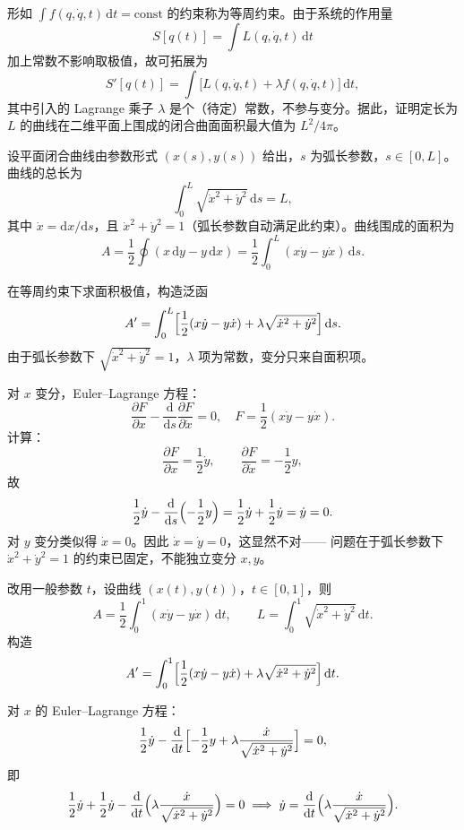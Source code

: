 \begin{question}
形如 \(\displaystyle\int f(q,\dot q,t)\,\mathrm dt = \text{const}\) 的约束称为等周约束。由于系统的作用量
\[
S[q(t)] = \int L(q,\dot q,t)\,\mathrm dt
\]
加上常数不影响取极值，故可拓展为
\[
S'[q(t)] = \int \bigl[L(q,\dot q,t) + \lambda f(q,\dot q,t)\bigr]\,\mathrm dt,
\]
其中引入的 Lagrange 乘子 \(\lambda\) 是个（待定）常数，不参与变分。据此，证明定长为 \(L\) 的曲线在二维平面上围成的闭合曲面面积最大值为 \(L^2/4\pi\)。
\begin{solution}
设平面闭合曲线由参数形式 \((x(s), y(s))\) 给出，\(s\) 为弧长参数，\(s \in [0,L]\)。曲线的总长为
\[
\int_0^L \sqrt{\dot x^2 + \dot y^2}\,\mathrm ds = L,
\]
其中 \(\dot x = \mathrm dx/\mathrm ds\)，且 \(\dot x^2 + \dot y^2 = 1\)（弧长参数自动满足此约束）。曲线围成的面积为
\[
A = \frac12\oint (x\,\mathrm dy - y\,\mathrm dx)
= \frac12\int_0^L (x\dot y - y\dot x)\,\mathrm ds .
\]

在等周约束下求面积极值，构造泛函
\[
A' = \int_0^L \Bigl[\frac12(x\dot y - y\dot x) + \lambda\sqrt{\dot x^2 + \dot y^2}\Bigr]\,\mathrm ds .
\]
由于弧长参数下 \(\sqrt{\dot x^2 + \dot y^2}=1\)，\(\lambda\) 项为常数，变分只来自面积项。

对 \(x\) 变分，Euler--Lagrange 方程：
\[
\frac{\partial F}{\partial x} - \frac{\mathrm d}{\mathrm ds}\frac{\partial F}{\partial\dot x} = 0,
\quad F = \frac12(x\dot y - y\dot x) .
\]
计算：
\[
\frac{\partial F}{\partial x} = \frac12\dot y,\qquad
\frac{\partial F}{\partial\dot x} = -\frac12 y,
\]
故
\[
\frac12\dot y - \frac{\mathrm d}{\mathrm ds}\Bigl(-\frac12 y\Bigr)
= \frac12\dot y + \frac12\dot y = \dot y = 0 .
\]
对 \(y\) 变分类似得 \(\dot x = 0\)。因此 \(\dot x = \dot y = 0\)，这显然不对——
问题在于弧长参数下 \(\dot x^2 + \dot y^2 = 1\) 的约束已固定，不能独立变分 \(x,y\)。

改用一般参数 \(t\)，设曲线 \((x(t),y(t))\)，\(t\in[0,1]\)，则
\[
A = \frac12\int_0^1 (x\dot y - y\dot x)\,\mathrm dt,\qquad
L = \int_0^1 \sqrt{\dot x^2 + \dot y^2}\,\mathrm dt .
\]
构造
\[
A' = \int_0^1 \Bigl[\frac12(x\dot y - y\dot x) + \lambda\sqrt{\dot x^2 + \dot y^2}\Bigr]\,\mathrm dt .
\]

对 \(x\) 的 Euler--Lagrange 方程：
\[
\frac12\dot y - \frac{\mathrm d}{\mathrm dt}\Bigl[-\frac12 y + \lambda\frac{\dot x}{\sqrt{\dot x^2 + \dot y^2}}\Bigr] = 0,
\]
即
\[
\frac12\dot y + \frac12\dot y - \frac{\mathrm d}{\mathrm dt}\Bigl(\lambda\frac{\dot x}{\sqrt{\dot x^2 + \dot y^2}}\Bigr) = 0
\;\Longrightarrow\; \dot y = \frac{\mathrm d}{\mathrm dt}\Bigl(\lambda\frac{\dot x}{\sqrt{\dot x^2 + \dot y^2}}\Bigr).
\]


\end{solution}
\end{question}
